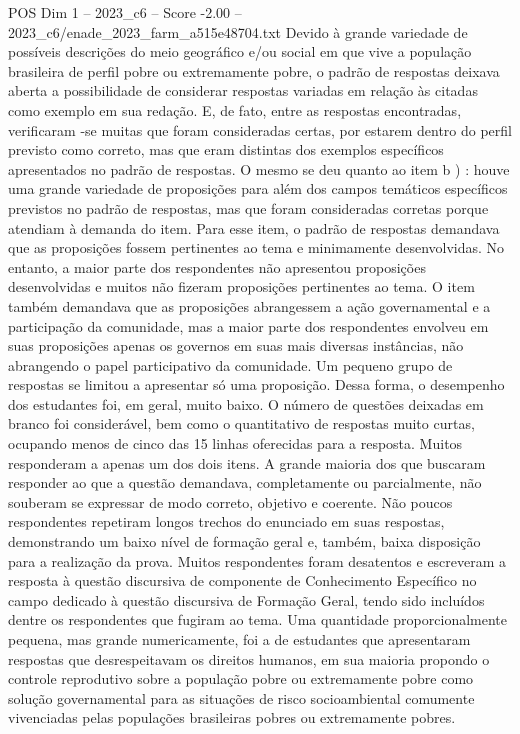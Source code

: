 \begin{textsample}{POS Dim 1 – 2023\_c6 – Score -2.00 – 2023\_c6/enade\_2023\_farm\_a515e48704.txt}
Devido à grande variedade de possíveis descrições do meio geográfico e/ou social em que vive a população brasileira de perfil pobre ou extremamente pobre, o padrão de respostas deixava aberta a possibilidade de considerar respostas variadas em relação às citadas como exemplo em sua redação.
E, de fato, entre as respostas encontradas, verificaram -se muitas que foram consideradas certas, por estarem dentro do perfil previsto como correto, mas que eram distintas dos exemplos específicos apresentados no padrão de respostas.
O mesmo se deu quanto ao item b ) : houve uma grande variedade de proposições para além dos campos temáticos específicos previstos no padrão de respostas, mas que foram consideradas corretas porque atendiam à demanda do item.
Para esse item, o padrão de respostas demandava que as proposições fossem pertinentes ao tema e minimamente desenvolvidas.
No entanto, a maior parte dos respondentes não apresentou proposições desenvolvidas e muitos não fizeram proposições pertinentes ao tema.
O item também demandava que as proposições abrangessem a ação governamental e a participação da comunidade, mas a maior parte dos respondentes envolveu em suas proposições apenas os governos em suas mais diversas instâncias, não abrangendo o papel participativo da comunidade.
Um pequeno grupo de respostas se limitou a apresentar só uma proposição.
Dessa forma, o desempenho dos estudantes foi, em geral, muito baixo.
O número de questões deixadas em branco foi considerável, bem como o quantitativo de respostas muito curtas, ocupando menos de cinco das 15 linhas oferecidas para a resposta.
Muitos responderam a apenas um dos dois itens.
A grande maioria dos que buscaram responder ao que a questão demandava, completamente ou parcialmente, não souberam se expressar de modo correto, objetivo e coerente.
Não poucos respondentes repetiram longos trechos do enunciado em suas respostas, demonstrando um baixo nível de formação geral e, também, baixa disposição para a realização da prova.
Muitos respondentes foram desatentos e escreveram a resposta à questão discursiva de componente de Conhecimento Específico no campo dedicado à questão discursiva de Formação Geral, tendo sido incluídos dentre os respondentes que fugiram ao tema.
Uma quantidade proporcionalmente pequena, mas grande numericamente, foi a de estudantes que apresentaram respostas que desrespeitavam os direitos humanos, em sua maioria propondo o controle reprodutivo sobre a população pobre ou extremamente pobre como solução governamental para as situações de risco socioambiental comumente vivenciadas pelas populações brasileiras pobres ou extremamente pobres.

\end{textsample}
